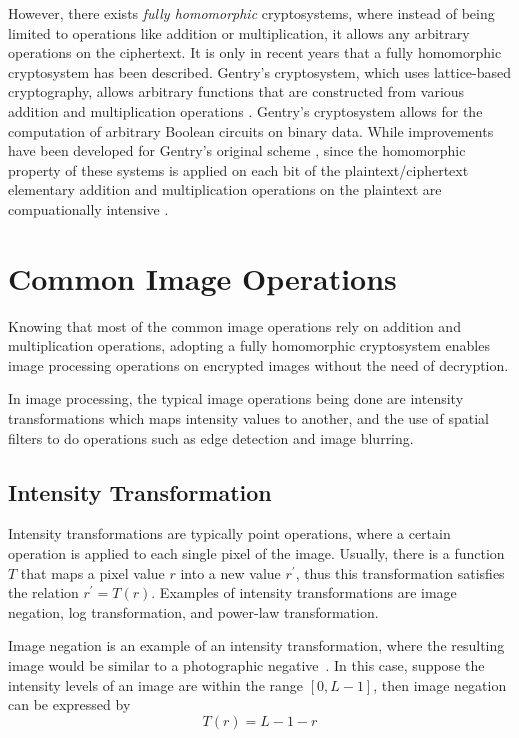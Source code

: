 However, there exists \textit{fully homomorphic} cryptosystems, where instead of being limited to operations like addition or multiplication, it allows any arbitrary operations on the ciphertext. It is only in recent years that a fully homomorphic cryptosystem has been described. Gentry's cryptosystem, which uses lattice-based cryptography, allows arbitrary functions that are constructed from various addition and multiplication operations \cite{gentry_fully_2009}. Gentry's cryptosystem allows for the computation of arbitrary Boolean circuits on binary data. While improvements have been developed for Gentry's original scheme \cite{hutchison_fully_2010, sen_homomorphic_2013}, since the homomorphic property of these systems is applied on each bit of the plaintext/ciphertext elementary addition and multiplication operations on the plaintext are compuationally intensive \cite{sen_homomorphic_2013, shortell_secure_2016}.

\section{Common Image Operations}

Knowing that most of the common image operations rely on addition and multiplication operations, adopting a fully homomorphic cryptosystem enables image processing operations on encrypted images without the need of decryption.

In image processing, the typical image operations being done are intensity transformations which maps intensity values to another, and the use of spatial filters to do operations such as edge detection and image blurring.

\subsection{Intensity Transformation}
Intensity transformations are typically point operations, where a certain operation is applied to each single pixel of the image. Usually, there is a function $T$ that maps a pixel value $r$ into a new value $r^\prime$, thus this transformation satisfies the relation $r^\prime = T\left(r\right)$. Examples of intensity transformations are image negation, log transformation, and power-law transformation.

Image negation is an example of an intensity transformation, where the resulting image would be similar to a photographic negative~\cite{gonzalez_digital_2008}. In this case, suppose the intensity levels of an image are within the range $\left[0, L-1\right]$, then image negation can be expressed by
\begin{equation}
    T\left(r\right) = L-1-r
\end{equation}

